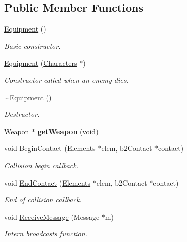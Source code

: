 \subsection*{Public Member Functions}
\begin{DoxyCompactItemize}
\item 
\hyperlink{class_equipment_a2bd67c4254f2074f4f7469f29a20e760}{Equipment} ()
\begin{DoxyCompactList}\small\item\em Basic constructor. \end{DoxyCompactList}\item 
\hyperlink{class_equipment_aeb2356275b65e0d7874aeaee05dc30a4}{Equipment} (\hyperlink{class_characters}{Characters} $\ast$)
\begin{DoxyCompactList}\small\item\em Constructor called when an enemy dies. \end{DoxyCompactList}\item 
\hypertarget{class_equipment_a3e7f53e57fa3004b5a4490e2c7a1fbaf}{\hyperlink{class_equipment_a3e7f53e57fa3004b5a4490e2c7a1fbaf}{$\sim$\-Equipment} ()}\label{class_equipment_a3e7f53e57fa3004b5a4490e2c7a1fbaf}

\begin{DoxyCompactList}\small\item\em Destructor. \end{DoxyCompactList}\item 
\hypertarget{class_equipment_a54fd1c2d6cca6b4d2584eb0cf8725bd2}{\hyperlink{class_weapon}{Weapon} $\ast$ {\bfseries get\-Weapon} (void)}\label{class_equipment_a54fd1c2d6cca6b4d2584eb0cf8725bd2}

\item 
void \hyperlink{class_equipment_a0c706b45578e8d01fec7b8ee1b773987}{Begin\-Contact} (\hyperlink{class_elements}{Elements} $\ast$elem, b2\-Contact $\ast$contact)
\begin{DoxyCompactList}\small\item\em Collision begin callback. \end{DoxyCompactList}\item 
void \hyperlink{class_equipment_abda1acd976a1c33f3aa398b3a9a64555}{End\-Contact} (\hyperlink{class_elements}{Elements} $\ast$elem, b2\-Contact $\ast$contact)
\begin{DoxyCompactList}\small\item\em End of collision callback. \end{DoxyCompactList}\item 
void \hyperlink{class_equipment_ab195be955597ce6f64c117d675df3af4}{Receive\-Message} (Message $\ast$m)
\begin{DoxyCompactList}\small\item\em Intern broadcasts function. \end{DoxyCompactList}\end{DoxyCompactItemize}
